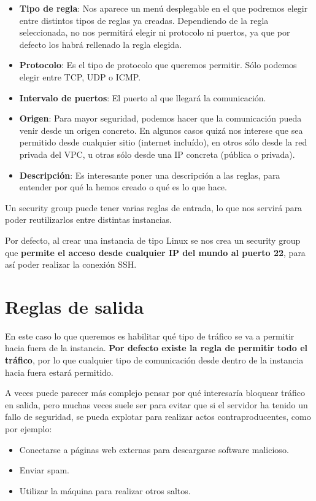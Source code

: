 \begin{itemize}
	\item \textbf{Tipo de regla}: Nos aparece un menú desplegable en el que podremos elegir entre distintos tipos de reglas ya creadas. Dependiendo de la regla seleccionada, no nos permitirá elegir ni protocolo ni puertos, ya que por defecto los habrá rellenado la regla elegida.
	\item \textbf{Protocolo}: Es el tipo de protocolo que queremos permitir. Sólo podemos elegir entre TCP, UDP o ICMP.
	\item \textbf{Intervalo de puertos}: El puerto al que llegará la comunicación.
	\item \textbf{Origen}: Para mayor seguridad, podemos hacer que la comunicación pueda venir desde un origen concreto. En algunos casos quizá nos interese que sea permitido desde cualquier sitio (internet incluído), en otros sólo desde la red privada del VPC, u otras sólo desde una IP concreta (pública o privada).


	\item \textbf{Descripción}: Es interesante poner una descripción a las reglas, para entender por qué la hemos creado o qué es lo que hace.
\end{itemize}

Un security group puede tener varias reglas de entrada, lo que nos servirá para poder reutilizarlos entre distintas instancias.

Por defecto, al crear una instancia de tipo Linux se nos crea un security group que \textbf{permite el acceso desde cualquier IP del mundo al puerto 22}, para así poder realizar la conexión SSH.

\section{Reglas de salida}

En este caso lo que queremos es habilitar qué tipo de tráfico se va a permitir hacia fuera de la instancia. \textbf{Por defecto existe la regla de permitir todo el tráfico}, por lo que cualquier tipo de comunicación desde dentro de la instancia hacia fuera estará permitido.

A veces puede parecer más complejo pensar por qué interesaría bloquear tráfico en salida, pero muchas veces suele ser para evitar que si el servidor ha tenido un fallo de seguridad, se pueda explotar para realizar actos contraproducentes, como por ejemplo:

\begin{itemize}
	\item Conectarse a páginas web externas para descargarse software malicioso.
	\item Enviar spam.
	\item Utilizar la máquina para realizar otros saltos.
\end{itemize}

